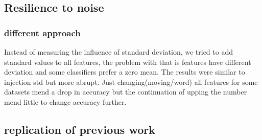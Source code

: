 \documentclass[a4paper,10pt]{article}
\begin{document}
\subsection{Resilience to noise}






\subsubsection{different approach}
Instead of measuring the influence of standard deviation, we tried to add standard values to all features, the problem with that is features have different deviation and some classifiers prefer a zero mean. The results were similar to injection std but more abrupt. Just changing(moving/word) all features for some datasets mend a drop in accuracy but the continuation of upping the number mend little to change accuracy further.




\subsection{replication of previous work}
\end{document}
